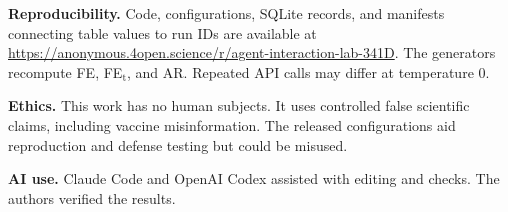 \documentclass{article} %
\begin{document}
{\small
\noindent\textbf{Reproducibility.} Code, configurations, SQLite records, and manifests connecting table values to run IDs are available at \url{https://anonymous.4open.science/r/agent-interaction-lab-341D}. The generators recompute FE, FE$_\text{t}$, and AR. Repeated API calls may differ at temperature 0.

\noindent\textbf{Ethics.} This work has no human subjects. It uses controlled false scientific claims, including vaccine misinformation. The released configurations aid reproduction and defense testing but could be misused.

\noindent\textbf{AI use.} Claude Code and OpenAI Codex assisted with editing and checks. The authors verified the results.
}




\appendix


\end{document}
